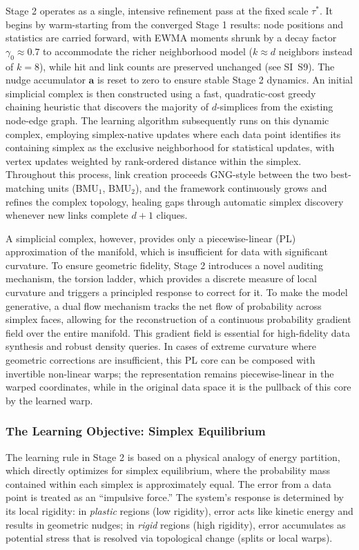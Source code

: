 \documentclass[11pt]{article}
\begin{document}
Stage 2 operates as a single, intensive refinement pass at the fixed scale $\tau^*$. It begins by warm-starting from the converged Stage 1 results: node positions and statistics are carried forward, with EWMA moments shrunk by a decay factor $\gamma_0 \approx 0.7$ to accommodate the richer neighborhood model ($k \approx d$ neighbors instead of $k=8$), while hit and link counts are preserved unchanged (see SI~S9). The nudge accumulator $\mathbf a$ is reset to zero to ensure stable Stage 2 dynamics. An initial simplicial complex is then constructed using a fast, quadratic-cost greedy chaining heuristic that discovers the majority of $d$-simplices from the existing node-edge graph. The learning algorithm subsequently runs on this dynamic complex, employing simplex-native updates where each data point identifies its containing simplex as the exclusive neighborhood for statistical updates, with vertex updates weighted by rank-ordered distance within the simplex. Throughout this process, link creation proceeds GNG-style between the two best-matching units (BMU$_1$, BMU$_2$), and the framework continuously grows and refines the complex topology, healing gaps through automatic simplex discovery whenever new links complete $d+1$ cliques.

A simplicial complex, however, provides only a piecewise-linear (PL) approximation of the manifold, which is insufficient for data with significant curvature. To ensure geometric fidelity, Stage 2 introduces a novel auditing mechanism, the torsion ladder, which provides a discrete measure of local curvature and triggers a principled response to correct for it. To make the model generative, a dual flow mechanism tracks the net flow of probability across simplex faces, allowing for the reconstruction of a continuous probability gradient field over the entire manifold. This gradient field is essential for high-fidelity data synthesis and robust density queries. In cases of extreme curvature where geometric corrections are insufficient, this PL core can be composed with invertible non-linear warps; the representation remains piecewise-linear in the warped coordinates, while in the original data space it is the pullback of this core by the learned warp.

\subsubsection{The Learning Objective: Simplex Equilibrium}
The learning rule in Stage 2 is based on a physical analogy of energy partition, which directly optimizes for simplex equilibrium, where the probability mass contained within each simplex is approximately equal. The error from a data point is treated as an ``impulsive force.'' The system's response is determined by its local rigidity: in \emph{plastic} regions (low rigidity), error acts like kinetic energy and results in geometric nudges; in \emph{rigid} regions (high rigidity), error accumulates as potential stress that is resolved via topological change (splits or local warps).
\end{document}
